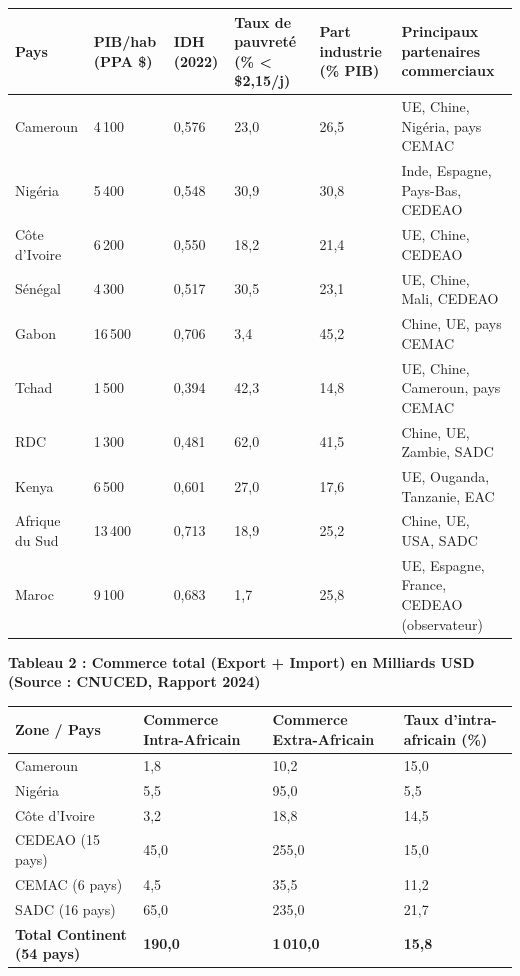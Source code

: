 \documentclass[11pt]{article}
\begin{document}
\begin{center}
\begin{tabularx}{\linewidth}{|l|X|X|X|X|X|}\hline
\textbf{Pays} & \textbf{PIB/hab (PPA \$)} & \textbf{IDH (2022)} & \textbf{Taux de pauvreté (\% < \$2,15/j)} & \textbf{Part industrie (\% PIB)} & \textbf{Principaux partenaires commerciaux} \\ \hline
Cameroun & 4\,100 & 0,576 & 23,0 & 26,5 & UE, Chine, Nigéria, pays CEMAC \\ \hline
Nigéria & 5\,400 & 0,548 & 30,9 & 30,8 & Inde, Espagne, Pays-Bas, CEDEAO \\ \hline
Côte d'Ivoire & 6\,200 & 0,550 & 18,2 & 21,4 & UE, Chine, CEDEAO \\ \hline
Sénégal & 4\,300 & 0,517 & 30,5 & 23,1 & UE, Chine, Mali, CEDEAO \\ \hline
Gabon & 16\,500 & 0,706 & 3,4 & 45,2 & Chine, UE, pays CEMAC \\ \hline
Tchad & 1\,500 & 0,394 & 42,3 & 14,8 & UE, Chine, Cameroun, pays CEMAC \\ \hline
RDC & 1\,300 & 0,481 & 62,0 & 41,5 & Chine, UE, Zambie, SADC \\ \hline
Kenya & 6\,500 & 0,601 & 27,0 & 17,6 & UE, Ouganda, Tanzanie, EAC \\ \hline
Afrique du Sud & 13\,400 & 0,713 & 18,9 & 25,2 & Chine, UE, USA, SADC \\ \hline
Maroc & 9\,100 & 0,683 & 1,7 & 25,8 & UE, Espagne, France, CEDEAO (observateur) \\ \hline
\end{tabularx}
\end{center}

\textbf{Tableau 2 : Commerce total (Export + Import) en Milliards USD (Source : CNUCED, Rapport 2024)}

\begin{center}
\begin{tabularx}{\linewidth}{|l|X|X|X|}\hline
\textbf{Zone / Pays} & \textbf{Commerce Intra-Africain} & \textbf{Commerce Extra-Africain} & \textbf{Taux d'intra-africain (\%)} \\ \hline
Cameroun & 1,8 & 10,2 & 15,0 \\ \hline
Nigéria & 5,5 & 95,0 & 5,5 \\ \hline
Côte d'Ivoire & 3,2 & 18,8 & 14,5 \\ \hline
CEDEAO (15 pays) & 45,0 & 255,0 & 15,0 \\ \hline
CEMAC (6 pays) & 4,5 & 35,5 & 11,2 \\ \hline
SADC (16 pays) & 65,0 & 235,0 & 21,7 \\ \hline
\textbf{Total Continent (54 pays)} & \textbf{190,0} & \textbf{1\,010,0} & \textbf{15,8} \\ \hline
\end{tabularx}
\end{center}
\end{document}
